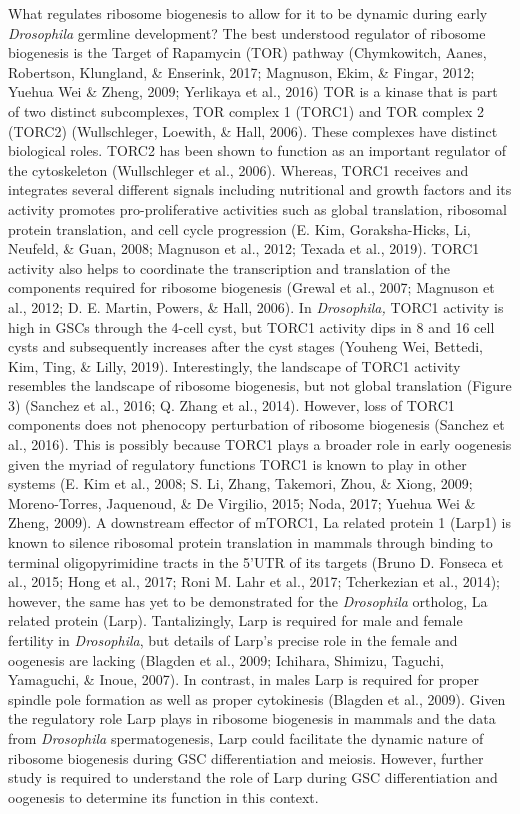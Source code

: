 \documentclass[12pt,oneside]{reedthesis}
\begin{document}
What regulates ribosome biogenesis to allow for it to be dynamic during
early \emph{Drosophila} germline development? The best understood regulator
of ribosome biogenesis is the Target of Rapamycin (TOR) pathway
(Chymkowitch, Aanes, Robertson, Klungland, \& Enserink, 2017; Magnuson, Ekim, \& Fingar, 2012; Yuehua Wei \& Zheng, 2009; Yerlikaya et al., 2016)
TOR is a kinase that is part of two distinct subcomplexes, TOR complex 1
(TORC1) and TOR complex 2 (TORC2) (Wullschleger, Loewith, \& Hall, 2006). These
complexes have distinct biological roles. TORC2 has been shown to
function as an important regulator of the cytoskeleton
(Wullschleger et al., 2006). Whereas, TORC1 receives and integrates several
different signals including nutritional and growth factors and its
activity promotes pro-proliferative activities such as global
translation, ribosomal protein translation, and cell cycle progression
(E. Kim, Goraksha-Hicks, Li, Neufeld, \& Guan, 2008; Magnuson et al., 2012; Texada et al., 2019). TORC1 activity also helps
to coordinate the transcription and translation of the components
required for ribosome biogenesis (Grewal et al., 2007; Magnuson et al., 2012; D. E. Martin, Powers, \& Hall, 2006). In \emph{Drosophila,} TORC1 activity is high in GSCs through
the 4-cell cyst, but TORC1 activity dips in 8 and 16 cell cysts and
subsequently increases after the cyst stages (Youheng Wei, Bettedi, Kim, Ting, \& Lilly, 2019).
Interestingly, the landscape of TORC1 activity resembles the landscape
of ribosome biogenesis, but not global translation (Figure 3)
(Sanchez et al., 2016; Q. Zhang et al., 2014). However, loss of TORC1 components does
not phenocopy perturbation of ribosome biogenesis (Sanchez et al., 2016).
This is possibly because TORC1 plays a broader role in early oogenesis
given the myriad of regulatory functions TORC1 is known to play in other
systems (E. Kim et al., 2008; S. Li, Zhang, Takemori, Zhou, \& Xiong, 2009; Moreno-Torres, Jaquenoud, \& De Virgilio, 2015; Noda, 2017; Yuehua Wei \& Zheng, 2009). A downstream effector of mTORC1, La related protein 1
(Larp1) is known to silence ribosomal protein translation in mammals
through binding to terminal oligopyrimidine tracts in the 5'UTR of its
targets (Bruno D. Fonseca et al., 2015; Hong et al., 2017; Roni M. Lahr et al., 2017; Tcherkezian et al., 2014); however, the same has yet to be
demonstrated for the \emph{Drosophila} ortholog, La related protein (Larp).
Tantalizingly, Larp is required for male and female fertility in
\emph{Drosophila}, but details of Larp's precise role in the female and
oogenesis are lacking (Blagden et al., 2009; Ichihara, Shimizu, Taguchi, Yamaguchi, \& Inoue, 2007). In contrast,
in males Larp is required for proper spindle pole formation as well as
proper cytokinesis (Blagden et al., 2009). Given the regulatory role Larp
plays in ribosome biogenesis in mammals and the data from \emph{Drosophila}
spermatogenesis, Larp could facilitate the dynamic nature of ribosome
biogenesis during GSC differentiation and meiosis. However, further
study is required to understand the role of Larp during GSC
differentiation and oogenesis to determine its function in this context.
\end{document}
